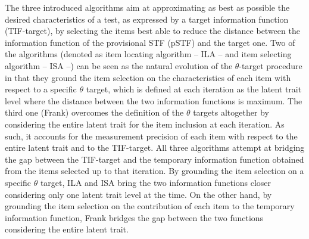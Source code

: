 \documentclass[12pt, a4paper, titilepage]{article}
\begin{document}
The three introduced algorithms aim at approximating as best as possible the desired characteristics of a test, as expressed by a target information function (TIF-target), by selecting the items best able to reduce the distance between the information function of the provisional STF (pSTF) and the target one. 
Two of the algorithms (denoted as item locating algorithm -- ILA -- and item selecting algorithm -- ISA --) can be seen as the natural evolution of the $\theta$-target procedure in that they ground the item selection on the characteristics of each item with respect to a specific $\theta$ target, which is defined at each iteration as the latent trait level where the distance between the two information functions is maximum.
The third one (Frank) overcomes the definition of the $\theta$ targets altogether by considering the entire latent trait for the item inclusion at each iteration. As such, it accounts for the measurement precision of each item with respect to the entire latent trait and to the TIF-target. 
All three algorithms attempt at bridging the gap between the TIF-target and the temporary information function obtained from the items selected up to that iteration. 
By grounding the item selection on a specific $\theta$ target, ILA and ISA bring the two information functions closer considering only one latent trait level at the time. 
On the other hand, by grounding the item selection on the contribution of each item to the temporary information function, Frank bridges the gap between the two functions considering the entire latent trait. 
\normalcolor
\end{document}

